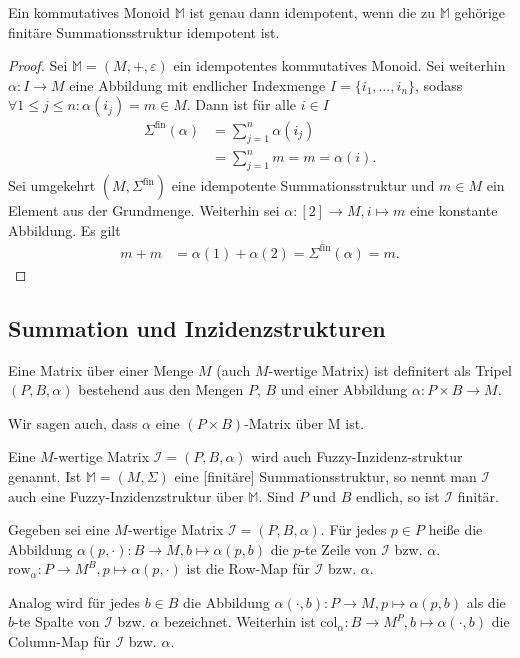 \documentclass{article}
\begin{document}
\begin{theorem}\label{Theorem_IdempotentSumMonoid}
  Ein kommutatives Monoid $\mathbb{M}$ ist genau dann idempotent, 
  wenn die zu $\mathbb{M}$ gehörige finitäre Summationsstruktur idempotent ist.
\end{theorem}
\begin{proof}
  Sei $\mathbb{M} = (M, +, \varepsilon)$ ein idempotentes kommutatives Monoid.
  Sei weiterhin $\alpha \colon I \to M$ eine Abbildung mit endlicher Indexmenge $I = \{i_1, \dots, i_n\}$,
  sodass $\forall 1 \leq j \leq n \colon \alpha(i_j) = m \in M$.
  Dann ist für alle $i \in I$
  \begin{align*}
    \Sigma^\text{fin}(\alpha) &= \sum_{j = 1}^n\alpha(i_j) \\
    &= \sum_{j = 1}^n m = m = \alpha(i).
  \end{align*}
  Sei umgekehrt $(M, \Sigma^\text{fin})$ eine idempotente Summationsstruktur und $m \in M$ ein Element aus der Grundmenge.
  Weiterhin sei $\alpha \colon [2] \to M, i \mapsto m$ eine konstante Abbildung.
  Es gilt
  \begin{align*}
    m + m &= \alpha(1) + \alpha(2) = \Sigma^\text{fin}(\alpha) = m.
  \end{align*}
\end{proof}

\subsection{Summation und Inzidenzstrukturen}

\begin{definition}
  Eine Matrix über einer Menge $M$ (auch $M$-wertige Matrix) ist definitert als Tripel $(P, B, \alpha)$
  bestehend aus den Mengen $P$, $B$ und einer Abbildung $\alpha \colon P \times B \to M$.
  
  Wir sagen auch, dass $\alpha$ eine $(P \times B)$-Matrix über M ist. 
\end{definition}

\begin{definition}
  Eine $M$-wertige Matrix $\mathcal{I} = (P, B, \alpha)$ wird auch Fuzzy-Inzidenz-struktur genannt.
  Ist $\mathbb{M} = (M, \Sigma)$ eine [finitäre] Summationsstruktur, 
  so nennt man $\mathcal{I}$ auch eine Fuzzy-Inzidenzstruktur über $\mathbb{M}$.
  Sind $P$ und $B$ endlich, so ist $\mathcal{I}$ finitär.
\end{definition}

\begin{definition}
  Gegeben sei eine $M$-wertige Matrix $\mathcal{I} = (P, B, \alpha)$.
  Für jedes $p \in P$ heiße die Abbildung $\alpha(p, \cdot) \colon B \to M, b \mapsto \alpha(p, b)$
  die $p$-te Zeile von $\mathcal{I}$ bzw. $\alpha$.
  $\text{row}_\alpha \colon P \to M^B, p \mapsto \alpha(p, \cdot)$ ist die Row-Map für $\mathcal{I}$ bzw. $\alpha$.

  Analog wird für jedes $b \in B$ die Abbildung $\alpha(\cdot, b) \colon P \to M, p \mapsto \alpha(p, b)$
  als die $b$-te Spalte von $\mathcal{I}$ bzw. $\alpha$ bezeichnet.
  Weiterhin ist $\text{col}_\alpha \colon B \to M^P, b \mapsto \alpha(\cdot, b)$ die Column-Map für $\mathcal{I}$ bzw. $\alpha$.
\end{definition}
\end{document}
